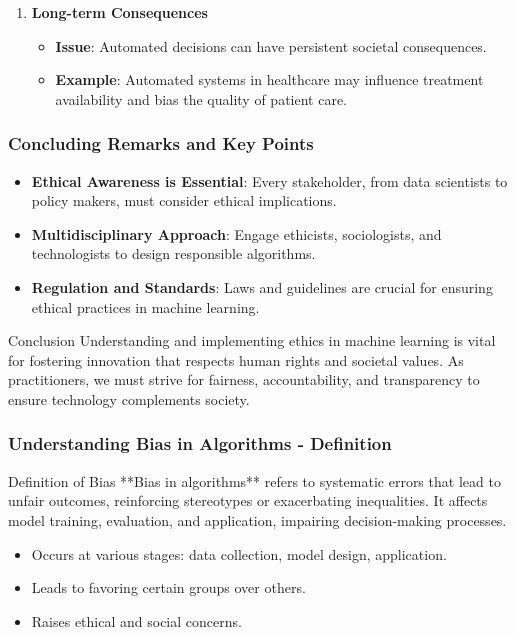 \documentclass{beamer}
\begin{document}
\begin{frame}[fragile]
\begin{enumerate}
        \item \textbf{Long-term Consequences}
            \begin{itemize}
                \item \textbf{Issue}: Automated decisions can have persistent societal consequences.
                \item \textbf{Example}: Automated systems in healthcare may influence treatment availability and bias the quality of patient care.
            \end{itemize}
    \end{enumerate}
\end{frame}

\begin{frame}[fragile]
    \frametitle{Concluding Remarks and Key Points}
    \begin{itemize}
        \item \textbf{Ethical Awareness is Essential}: Every stakeholder, from data scientists to policy makers, must consider ethical implications.
        \item \textbf{Multidisciplinary Approach}: Engage ethicists, sociologists, and technologists to design responsible algorithms.
        \item \textbf{Regulation and Standards}: Laws and guidelines are crucial for ensuring ethical practices in machine learning.
    \end{itemize}

    \begin{block}{Conclusion}
        Understanding and implementing ethics in machine learning is vital for fostering innovation that respects human rights and societal values. As practitioners, we must strive for fairness, accountability, and transparency to ensure technology complements society.
    \end{block}
\end{frame}

\begin{frame}[fragile]
    \frametitle{Understanding Bias in Algorithms - Definition}
    \begin{block}{Definition of Bias}
        **Bias in algorithms** refers to systematic errors that lead to unfair outcomes, reinforcing stereotypes or exacerbating inequalities. It affects model training, evaluation, and application, impairing decision-making processes.
    \end{block}

    \begin{itemize}
        \item Occurs at various stages: data collection, model design, application.
        \item Leads to favoring certain groups over others.
        \item Raises ethical and social concerns.
    \end{itemize}
\end{frame}
\end{document}

